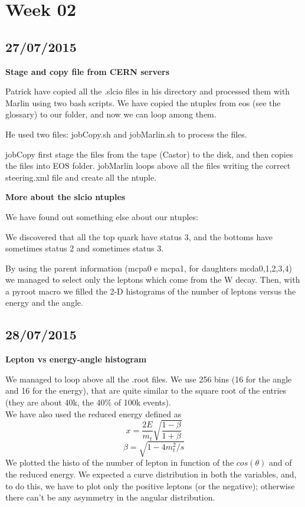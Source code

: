 \section{Week 02}

\subsection{27/07/2015}

\textbf{Stage and copy file from CERN servers}

Patrick have copied all the .slcio files in his directory and processed them with Marlin using two bash scripts. We have copied the ntuples from eos (see the glossary) to our folder, and now we can loop among them. 

He used two files: jobCopy.sh and jobMarlin.sh to process the files.

jobCopy first stage the files from the tape (Castor) to the disk, and then copies the files into EOS folder.
jobMarlin loops above all the files writing the correct steering.xml file and create all the ntuple.

\textbf{More about the slcio ntuples}

We have found out something else about our ntuples: 

We discovered that all the top quark have status 3, and the bottoms have sometimes status 2 and sometimes status 3.

By using the parent information (mcpa0 e mcpa1, for daughters mcda0,1,2,3,4) we managed to select only the leptons which come from the W decay. Then, with a pyroot macro we filled the 2-D histograms of the number of leptons versus the energy and the angle.


\subsection{28/07/2015}

\textbf{Lepton vs energy-angle histogram}

We managed to loop above all the .root files. We use 256 bins (16 for the angle and 16 for the energy), that are quite similar to the square root of the entries (they are about 40k, the 40\% of 100k events).\\
We have also used the reduced energy defined as \[x=\frac{2E}{m_t} \sqrt{\frac{1-\beta}{1+\beta}} \]   \[ \beta =\sqrt{1-4m_t^2/s} \]
We plotted the histo of the number of lepton in function of the $cos(\theta)$ and of the reduced energy. We expected a curve distribution in both the variables, and, to do this, we have to plot only the positive leptons (or the negative); otherwise there can't be any asymmetry in the angular distribution.

